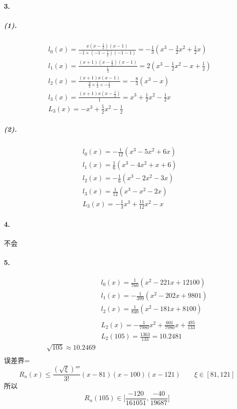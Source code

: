 \documentclass[UTF8]{ctexart}
\begin{document}
	\paragraph{3.}
		\subparagraph{(1).}
			\begin{displaymath}
			\begin{aligned}
				&l_0(x)=\frac{x(x-\frac{1}{2})(x-1)}{-1\times(-1-\frac{1}{2})(-1-1)}=-\frac{1}{3}(x^3-\frac{3}{2}x^2+\frac{1}{2}x)\\
				&l_1(x)=\frac{(x+1)(x-\frac{1}{2})(x-1)}{\frac{1}{2}}=2(x^3-\frac{1}{2}x^2-x+\frac{1}{2})\\
				&l_2(x)=\frac{(x+1)x(x-1)}{\frac{3}{2}\times\frac{1}{2}\times-\frac{1}{2}}=-\frac{8}{3}(x^3-x)\\
				&l_3(x)=\frac{(x+1)x(x-\frac{1}{2})}{1}=x^3+\frac{1}{2}x^2-\frac{1}{2}x\\
				&L_3(x)=-x^3+\frac{5}{2}x^2-\frac{1}{2}
			\end{aligned}
			\end{displaymath}
		\subparagraph{(2).}
			\begin{displaymath}
			\begin{aligned}
				&l_0(x)=-\frac{1}{12}(x^3-5x^2+6x)\\
				&l_1(x)=\frac{1}{6}(x^3-4x^2+x+6)\\
				&l_2(x)=-\frac{1}{6}(x^3-2x^2-3x)\\
				&l_3(x)=\frac{1}{12}(x^3-x^2-2x)\\
				&L_3(x)=-\frac{1}{3}x^3+\frac{11}{12}x^2-x
			\end{aligned}
			\end{displaymath}
	
	\paragraph{4.}
		不会
		
	\paragraph{5.}
		\begin{displaymath}
		\begin{aligned}
			&l_0(x)=\frac{1}{760}(x^2-221x+12100)\\
			&l_1(x)=-\frac{1}{399}(x^2-202x+9801)\\
			&l_2(x)=\frac{1}{840}(x^2-181x+8100)\\
			\\
			&L_2(x)=-\frac{1}{7980}x^2+\frac{601}{7980}x+\frac{495}{133}\\
			&L_2(105)=\frac{1363}{133}=10.2481\\
			\sqrt{105}\approx10.2469\\
		\end{aligned}
		\end{displaymath}
		误差界=$$R_n(x)\leq\frac{(\sqrt{\xi})'''}{3!}(x-81)(x-100)(x-121)\qquad\xi\in[81,121]$$
		所以$$R_n(105)\in\lbrack\frac{-120}{161051},\frac{-40}{19687}\rbrack$$
				
\end{document}
